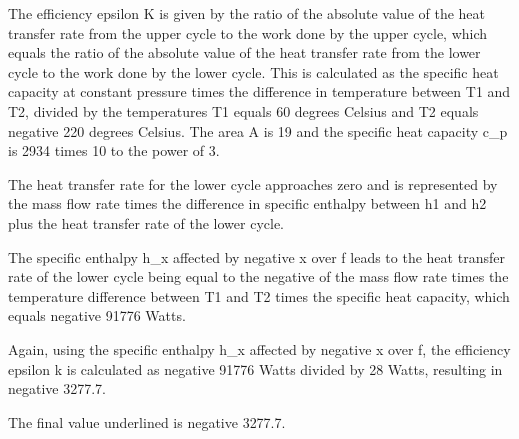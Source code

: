 The efficiency epsilon K is given by the ratio of the absolute value of the heat transfer rate from the upper cycle to the work done by the upper cycle, which equals the ratio of the absolute value of the heat transfer rate from the lower cycle to the work done by the lower cycle. This is calculated as the specific heat capacity at constant pressure times the difference in temperature between T1 and T2, divided by the temperatures T1 equals 60 degrees Celsius and T2 equals negative 220 degrees Celsius. The area A is 19 and the specific heat capacity c_p is 2934 times 10 to the power of 3.

The heat transfer rate for the lower cycle approaches zero and is represented by the mass flow rate times the difference in specific enthalpy between h1 and h2 plus the heat transfer rate of the lower cycle.

The specific enthalpy h_x affected by negative x over f leads to the heat transfer rate of the lower cycle being equal to the negative of the mass flow rate times the temperature difference between T1 and T2 times the specific heat capacity, which equals negative 91776 Watts.

Again, using the specific enthalpy h_x affected by negative x over f, the efficiency epsilon k is calculated as negative 91776 Watts divided by 28 Watts, resulting in negative 3277.7.

The final value underlined is negative 3277.7.